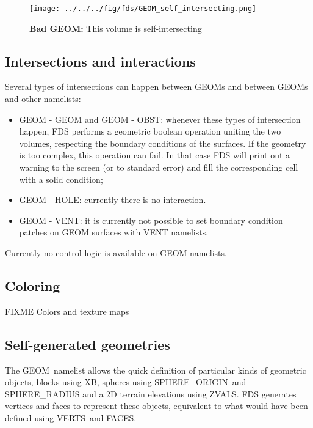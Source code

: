 \documentclass[12pt]{article}
\begin{document}
\begin{figure}
	\centering
	\texttt{[image: ../../../fig/fds/GEOM\_self\_intersecting.png]}
	\caption{\textbf{Bad {\ct GEOM}:} This volume is self-intersecting}
	\label{figure:GEOM_self_intersecting}
\end{figure}

\subsection{Intersections and interactions}

Several types of intersections can happen between {\ct GEOM}s and between {\ct GEOM}s and other namelists:

\begin{itemize}
	\item {\ct GEOM} - {\ct GEOM} and {\ct GEOM} - {\ct OBST}: whenever these types of intersection happen, FDS performs a geometric boolean operation uniting the two volumes, respecting the boundary conditions of the surfaces. If the geometry is too complex, this operation can fail. In that case FDS will print out a warning to the screen (or to standard error) and fill the corresponding cell with a solid condition;
	\item {\ct GEOM} - {\ct HOLE}: currently there is no interaction.
	\item {\ct GEOM} - {\ct VENT}: it is currently not possible to set boundary condition patches on {\ct GEOM} surfaces with {\ct VENT} namelists.
\end{itemize}

Currently no control logic is available on {\ct GEOM} namelists.

\subsection{Coloring}

FIXME Colors and texture maps

\subsection{Self-generated geometries}

The {\ct GEOM}\ namelist allows the quick definition of particular kinds of geometric objects, blocks using {\ct XB}, spheres using {\ct SPHERE\_ORIGIN}\ and {\ct SPHERE\_RADIUS}
and a 2D terrain elevations using {\ct ZVALS}. FDS generates vertices and faces to represent these objects, equivalent to what would have been defined using {\ct VERTS}\ and {\ct FACES}.
\end{document}
